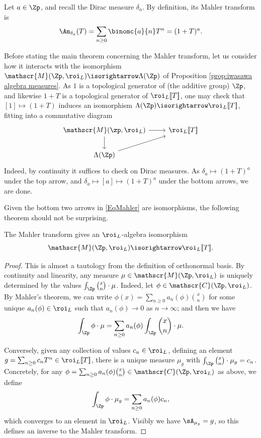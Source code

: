 \documentclass[a4paper,10pt, english, reqno]{smfart}
\newcommand{\lsem}{[\! [}
\newcommand{\rsem}{]\! ]}
\newcommand{\sM}{\mathscr{M}}
\newcommand{\sC}{\mathscr{C}}
\numberwithin{equation}{section}
\begin{document}
\begin{example}
Let $a \in \Zp$, and recall the Dirac measure $\delta_a$. By definition, its Mahler transform is
\[ 
\Am_{\delta_a}(T) = \sum_{n\geq 0}\binomc{a}{n} T^n = (1+T)^a. 
\]
\end{example}


Before stating the main theorem concerning the Mahler transform, let us consider how it interacts with the isomorphism $\mathscr{M}(\Zp,\roi_L) \isorightarrow \Lambda(\Zp)$ of Proposition \ref{prop:iwasawa algebra measures}. As $1$ is a topological generator of (the additive group) $\Zp$, and likewise $1+T$ is a topological generator of $\roi_L\lsem T\rsem$, one may check that $[1] \mapsto (1 + T)$ induces an isomorphism $\Lambda(\Zp) \isorightarrow \roi_L\lsem T\rsem$, fitting into a commutative diagram
\begin{equation} \label{EqMahler}
\begin{tikzcd}
\mathscr{M}(\zp, \roi_L) \ar[r] \ar[d] & \roi_L\lsem T \rsem \\
\Lambda(\Zp) \ar[ur] &
\end{tikzcd}
\end{equation}
Indeed, by continuity it suffices to check on Dirac measures. As $\delta_a \mapsto (1+T)^a$ under the top arrow, and $\delta_a \mapsto [a] \mapsto (1+T)^a$ under the bottom arrows, we are done.

Given the bottom two arrows in \eqref{EqMahler} are isomorphisms, the following theorem should not be surprising.


\begin{theorem}\label{thm:mahler}
The Mahler transform gives an $\roi_L$-algebra isomorphism
\[ \mathscr{M}(\Zp, \roi_L) \isorightarrow \roi_L\lsem T\rsem . \]
\end{theorem}


\begin{proof}
This is almost a tautology from the definition of orthonormal basis. By continuity and linearity, any measure $\mu \in \sM(\Zp,\roi_L)$ is uniquely determined by the values $\int_{\Zp} {x \choose n}\cdot \mu$. Indeed, let $\phi \in \sC(\Zp,\roi_L)$. By Mahler's theorem, we can write $\phi(x) = \sum_{n \geq 0} a_n(\phi) {x \choose n}$ for some unique $a_n(\phi) \in \roi_L$ such that $a_n(\phi) \to 0$ as $n \to \infty$; and then we have
\[
\int_{\Zp} \phi \cdot \mu = \sum_{n \geq 0} a_n(\phi)\int_{\Zp} {x \choose n} \cdot \mu.
\]

Conversely, given any collection of values $c_n \in \roi_L$, defining an element $g = \sum_{n\geq 0}c_nT^n \in \roi_L\lsem T\rsem$, there is a unique measure $\mu_g$ with $\int_{\Zp} {x \choose n} \cdot \mu_g = c_n$. Concretely, for any $\phi = \sum_{n\geq 0} a_n(\phi){x\choose n}\in \sC(\Zp,\roi_L)$ as above, we define
\[
\int_{\Zp} \phi \cdot \mu_g = \sum_{n \geq 0} a_n(\phi) c_n,
\]
which converges to an element in $\roi_L$. Visibly we have $\sA_{\mu_g} = g$, so this defines an inverse to the Mahler transform. 
\end{proof}
\end{document}
